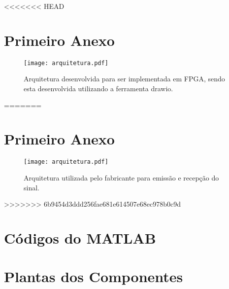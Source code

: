 \begin{anexosenv}

<<<<<<< HEAD
\chapter{Primeiro Anexo}

\begin{figure}[H]
    \centering
   \texttt{[image: arquitetura.pdf]}
  \caption{Arquitetura desenvolvida para ser implementada em FPGA, sendo esta desenvolvida utilizando a ferramenta drawio.}
   \label{arquitetura1}
    \end{figure}
	
=======
\partanexos

\chapter{Primeiro Anexo}

\begin{figure}[H]
  \centering
  \texttt{[image: arquitetura.pdf]}
  \caption{Arquitetura utilizada pelo fabricante para emissão e recepção do sinal.}
  \label{arquitetura1}
\end{figure}
>>>>>>> 6b9454d3ddd256fae681e614507e68ec978b0c9d

\chapter{Códigos do MATLAB}
    
\chapter{Plantas dos Componentes}

\end{anexosenv}